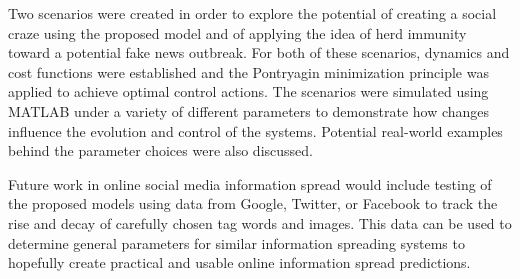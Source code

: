 Two scenarios were created in order to explore the potential of creating a social craze using the proposed model and of applying the idea of herd immunity toward a potential fake news outbreak. For both of these scenarios, dynamics and cost functions were established and the Pontryagin minimization principle was applied to achieve optimal control actions. The scenarios were simulated using MATLAB under a variety of different parameters to demonstrate how changes influence the evolution and control of the systems. Potential real-world examples behind the parameter choices were also discussed.

Future work in online social media information spread would include testing of the proposed models using data from Google, Twitter, or Facebook to track the rise and decay of carefully chosen tag words and images. This data can be used to determine general parameters for similar information spreading systems to hopefully create practical and usable online information spread predictions.